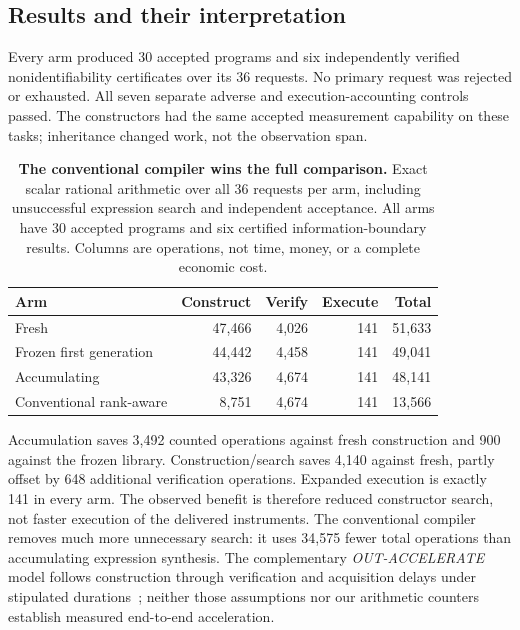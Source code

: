 \documentclass[10pt,a4paper]{article}
\begin{document}
\subsection{Results and their interpretation}


Every arm produced 30 accepted programs and six independently verified nonidentifiability certificates over its 36 requests. No primary request was rejected or exhausted. All seven separate adverse and execution-accounting controls passed. The constructors had the same accepted measurement capability on these tasks; inheritance changed work, not the observation span.

\begin{table}[htbp]
\centering\small
\caption{\textbf{The conventional compiler wins the full comparison.} Exact scalar rational arithmetic over all 36 requests per arm, including unsuccessful expression search and independent acceptance. All arms have 30 accepted programs and six certified information-boundary results. Columns are operations, not time, money, or a complete economic cost.}
\label{tab:foundry-phase}
\begin{tabularx}{\textwidth}{@{}Yrrrr@{}}
\toprule
\textbf{Arm} & \textbf{Construct} & \textbf{Verify} & \textbf{Execute} & \textbf{Total}\\
\midrule
Fresh & 47,466 & 4,026 & 141 & 51,633\\
Frozen first generation & 44,442 & 4,458 & 141 & 49,041\\
Accumulating & 43,326 & 4,674 & 141 & 48,141\\
Conventional rank-aware & 8,751 & 4,674 & 141 & 13,566\\
\bottomrule
\end{tabularx}
\end{table}

Accumulation saves 3,492 counted operations against fresh construction and 900 against the frozen library. Construction/search saves 4,140 against fresh, partly offset by 648 additional verification operations. Expanded execution is exactly 141 in every arm. The observed benefit is therefore reduced constructor search, not faster execution of the delivered instruments. The conventional compiler removes much more unnecessary search: it uses 34,575 fewer total operations than accumulating expression synthesis. The complementary \emph{OUT-ACCELERATE} model follows construction through verification and acquisition delays under stipulated durations~\citep{outaccelerate}; neither those assumptions nor our arithmetic counters establish measured end-to-end acceleration.
\end{document}
